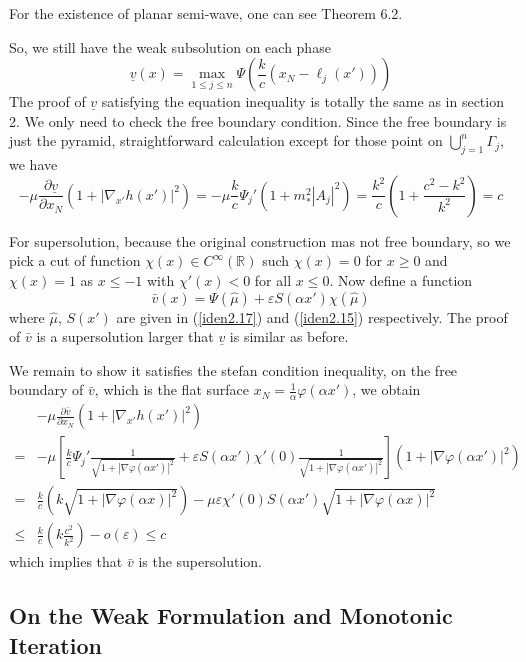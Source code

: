 \documentclass[12pt, a4paper]{article}
\numberwithin{equation}{section}
\newcommand{\R}{\mathbb{R}}
\newcommand{\pd}[2]{\frac{\partial #1}{\partial #2}}
\begin{document}
\begin{CJK}{UTF8}{bkai}
\begin{enumerate}
For the existence of planar semi-wave, one can see \cite{DL2013} Theorem 6.2.
\end{enumerate}

So, we still have the weak subsolution on each phase
\begin{equation}
	\underline{v}(x)=\max_{1\leq j\leq n}\Psi\left(\frac{k}{c}(x_N-\ell_j(x'))\right)
\end{equation}
The proof of $\underline{v}$ satisfying the equation inequality is totally the same as in section 2. We only need to check the free boundary condition. Since the free boundary is just the pyramid, straightforward calculation except for those point on $\bigcup\limits_{j=1}^n\Gamma_j$, we have
\[
	-\mu\pd{\underline{v}}{x_N}(1+|\nabla_{x'} h(x')|^2)=-\mu\frac{k}{c}\Psi_j'(1+m_*^2|A_j|^2)=\frac{k^2}{c}(1+\frac{c^2-k^2}{k^2})=c
\]


For supersolution, because the original construction mas not free boundary, so we pick a cut of function $\chi(x)\in C^\infty(\R)$ such $\chi(x)=0$ for $x\geq 0$ and $\chi(x)=1$ as $x\leq -1$ with $\chi'(x)<0$ for all $x\leq 0$. Now define a function
\begin{equation}
	\bar{v}(x)=\Psi(\hat{\mu})+\varepsilon S(\alpha x')\chi(\hat{\mu})
\end{equation}
where $\hat{\mu}$, $S(x')$ are given in (\ref{iden2.17}) and (\ref{iden2.15}) respectively. The proof of $\bar{v}$ is a supersolution larger that $\underline{v}$ is similar as before.

We remain to show it satisfies the stefan condition inequality, on the free boundary of $\bar{v}$, which is the flat surface $x_N=\frac{1}{\alpha}\varphi(\alpha x')$, we obtain
\begin{align*}
	&-\mu\pd{\bar{v}}{x_N}(1+|\nabla_{x'} h(x')|^2)\\
		=&-\mu\left[\frac{k}{c}\Psi_j'\frac{1}{\sqrt{1+|\nabla\varphi(\alpha x')|^2}}+\varepsilon S(\alpha x')\chi'(0)\frac{1}{\sqrt{1+|\nabla \varphi(\alpha x')|^2}}\right](1+|\nabla\varphi(\alpha x')|^2)\\
		=&\frac{k}{c}(k\sqrt{1+|\nabla\varphi(\alpha x)|^2})-\mu\varepsilon\chi'(0)S(\alpha x')\sqrt{1+|\nabla\varphi(\alpha x)|^2}\\
		\leq& \frac{k}{c}(k\frac{c^2}{k^2})-o(\varepsilon)\leq c 
\end{align*}
which implies that $\bar{v}$ is the supersolution.




\subsection{On the Weak Formulation and Monotonic Iteration}


\end{CJK}
\end{document}
